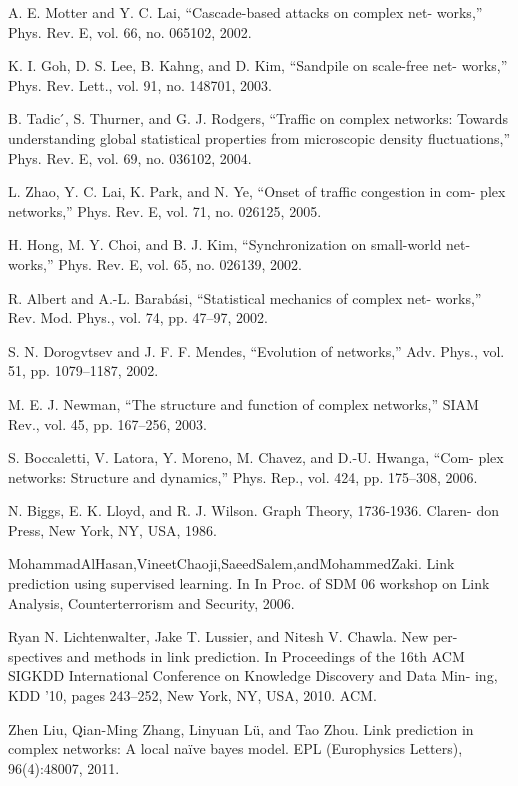 \documentclass[onecolumn,preprintnumbers,amsmath,amssymb]{revtex4}
\begin{document}
\begin{thebibliography}{00}
 A. E. Motter and Y. C. Lai, “Cascade-based attacks on complex net- works,” Phys. Rev. E, vol. 66, no. 065102, 2002.

 K. I. Goh, D. S. Lee, B. Kahng, and D. Kim, “Sandpile on scale-free net- works,” Phys. Rev. Lett., vol. 91, no. 148701, 2003.

 B. Tadic ́, S. Thurner, and G. J. Rodgers, “Traffic on complex networks: Towards understanding global statistical properties from microscopic density fluctuations,” Phys. Rev. E, vol. 69, no. 036102, 2004.

 L. Zhao, Y. C. Lai, K. Park, and N. Ye, “Onset of traffic congestion in com- plex networks,” Phys. Rev. E, vol. 71, no. 026125, 2005.

 H. Hong, M. Y. Choi, and B. J. Kim, “Synchronization on small-world net- works,” Phys. Rev. E, vol. 65, no. 026139, 2002.

 R. Albert and A.-L. Barabási, “Statistical mechanics of complex net- works,” Rev. Mod. Phys., vol. 74, pp. 47–97, 2002.

 S. N. Dorogvtsev and J. F. F. Mendes, “Evolution of networks,” Adv. Phys., vol. 51, pp. 1079–1187, 2002.

 M. E. J. Newman, “The structure and function of complex networks,” SIAM Rev., vol. 45, pp. 167–256, 2003.

 S. Boccaletti, V. Latora, Y. Moreno, M. Chavez, and D.-U. Hwanga, “Com- plex networks: Structure and dynamics,” Phys. Rep., vol. 424, pp. 175–308, 2006.


N. Biggs, E. K. Lloyd, and R. J. Wilson. Graph Theory, 1736-1936. Claren- don Press, New York, NY, USA, 1986.

MohammadAlHasan,VineetChaoji,SaeedSalem,andMohammedZaki. Link prediction using supervised learning. In In Proc. of SDM 06 workshop on Link Analysis, Counterterrorism and Security, 2006.

Ryan N. Lichtenwalter, Jake T. Lussier, and Nitesh V. Chawla. New per- spectives and methods in link prediction. In Proceedings of the 16th ACM SIGKDD International Conference on Knowledge Discovery and Data Min- ing, KDD ’10, pages 243–252, New York, NY, USA, 2010. ACM.

Zhen Liu, Qian-Ming Zhang, Linyuan Lü, and Tao Zhou. Link prediction in complex networks: A local naïve bayes model. EPL (Europhysics Letters), 96(4):48007, 2011.


\end{thebibliography}
\end{document}
